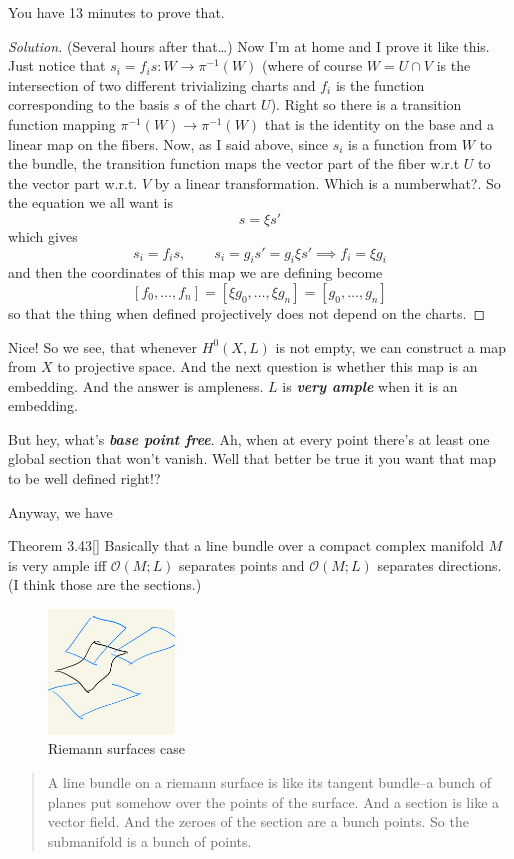 \begin{exercise}\leavevmode
You have 13 minutes to prove that.
\end{exercise}
\begin{proof}[Solution]\leavevmode
 (Several hours after that…) Now I'm at home and I prove it like this. Just notice that \(s_i=f_is:W \to \pi^{-1}(W)\) (where of course \(W=U \cap V\) is the intersection of two different trivializing charts and \(f_i\) is the function corresponding to the basis \(s\) of the chart \(U\)). Right so there is a transition function mapping \(\pi^{-1}(W) \to \pi^{-1}(W)\) that is the identity on the base and a linear map on the fibers. Now, as I said above, since \(s_i\) is a function from \(W\) to the bundle, the transition function maps the vector part of the fiber w.r.t \(U\) to the vector part w.r.t. \(V\) by a linear transformation. Which is a number{\color{2}what?}. So the equation we all want is
\[s=\xi s'\]
which gives
\[s_i=f_is,\qquad s_i=g_is'=g_i\xi s' \implies f_i=\xi g_i\]
and then the coordinates of this map we are defining become
\[[f_0,\ldots,f_n]=[\xi g_0,\ldots,\xi g_n]=[g_0,\ldots,g_n]\]
so that the thing when defined projectively does not depend on the charts.
\end{proof}

Nice! So we see, that whenever \(H^{0}(X,L)\) is not empty, we can construct a map from \(X\) to projective space. And the next question is whether this map is an embedding. And the answer is ampleness. \(L\) is \textit{\textbf{very  ample}} when it is an embedding.

But hey, what's \textit{\textbf{base point free}}. Ah, when at every point there's at least one global section that won't vanish. Well that better be true it you want that map to be well defined right!?

Anyway, we have
\begin{thing4}{Theorem 3.43}[\cite{lec}]\label{thm:3.43}\leavevmode
Basically that a line bundle over a compact complex manifold \(M\) is very ample iff \(\mathcal{O}(M;L)\) separates points and \(\mathcal{O}(M;L)\) separates directions. (I think those are the sections.)
\end{thing4}

\begin{figure}[H]
	\centering
	\includegraphics[width=0.3\textwidth]{fig1}
	\caption*{Riemann surfaces case}
\end{figure}
\begin{quotation}
A line bundle on a riemann surface is like its tangent bundle--a bunch of planes put somehow over the points of the surface. And a section is like a vector field. And the zeroes of the section are a bunch points. So the submanifold is a bunch of points.
\end{quotation}



